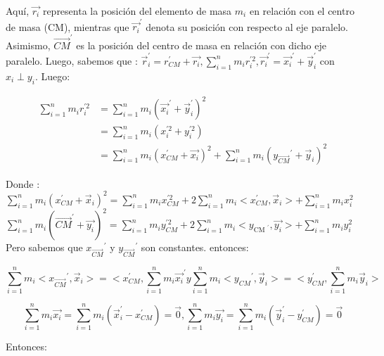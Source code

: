 \documentclass[10pt]{article}
\begin{document}
Aquí, $\overrightarrow{r_{i}}$ representa la posición del elemento de masa $m_{i}$ en relación con el centro de masa (CM), mientras que ${\overrightarrow{r_{i}}}^{\prime}$ denota su posición con respecto al eje paralelo. Asimismo, $\overrightarrow{C M}^{\prime}$ es la posición del centro de masa en relación con dicho eje paralelo.
Luego, sabemos que : $\vec{r}_{i}^{\prime}=r_{C M}^{\prime}+\overrightarrow{r_{i}}, \sum_{i=1}^{n} m_{i} r_{i}^{\prime 2},{\overrightarrow{r_{i}}}^{\prime}={\overrightarrow{x_{i}}}^{\prime}+\vec{y}_{i}^{\prime}$ con $x_{i} \perp y_{i}$. Luego:

$$
\begin{aligned}
\sum_{i=1}^{n} m_{i} r_{i}^{\prime 2} & =\sum_{i=1}^{n} m_{i}\left({\overrightarrow{x_{i}}}^{\prime}+\vec{y}_{i}^{\prime}\right)^{2} \\
& =\sum_{i=1}^{n} m_{i}\left(x_{i}^{\prime 2}+y_{i}^{\prime 2}\right) \\
& =\sum_{i=1}^{n} m_{i}\left(x_{C M}^{\prime}+\overrightarrow{x_{i}}\right)^{2}+\sum_{i=1}^{n} m_{i}\left(y_{\overrightarrow{C M}}{ }^{\prime}+\vec{y}_{i}\right)^{2}
\end{aligned}
$$

Donde :\\
$\sum_{i=1}^{n} m_{i}\left(x_{C M}^{\prime}+\vec{x}_{i}\right)^{2}=\sum_{i=1}^{n} m_{i} x_{C M}^{\prime 2}+2 \sum_{i=1}^{n} m_{i}<x_{C M}^{\prime}, \vec{x}_{i}>+\sum_{i=1}^{n} m_{i} x_{i}^{2}$\\
$\sum_{i=1}^{n} m_{i}\left(\overrightarrow{C M}^{\prime}+\overrightarrow{y_{i}}\right)^{2}=\sum_{i=1}^{n} m_{i} y_{C M}^{\prime 2}+2 \sum_{i=1}^{n} m_{i}<y_{\text {CM }^{\prime}}, \overrightarrow{y_{i}}>+\sum_{i=1}^{n} m_{i} y_{i}^{2}$\\
Pero sabemos que $x_{\overrightarrow{C M}}{ }^{\prime}$ y $y_{\overrightarrow{C M}}{ }^{\prime}$ son constantes. entonces:

$$
\sum_{i=1}^{n} m_{i}<x_{\overrightarrow{C M}}{ }^{\prime}, \vec{x}_{i}>=<x_{C M}^{\prime}, \sum_{i=1}^{n} m_{i}{\overrightarrow{x_{i}}}^{\prime} y \sum_{i=1}^{n} m_{i}<y_{C M}{ }^{\prime}, \vec{y}_{i}>=<y_{C M}^{\prime}, \sum_{i=1}^{n} m_{i} \vec{y}_{i}>
$$

$$
\sum_{i=1}^{n} m_{i} \overrightarrow{x_{i}}=\sum_{i=1}^{n} m_{i}\left(\vec{x}_{i}^{\prime}-x_{C M}^{\prime}\right)=\overrightarrow{0}, \sum_{i=1}^{n} m_{i} \overrightarrow{y_{i}}=\sum_{i=1}^{n} m_{i}\left(\vec{y}_{i}^{\prime}-y_{C M}^{\prime}\right)=\overrightarrow{0}
$$

Entonces:
\end{document}
